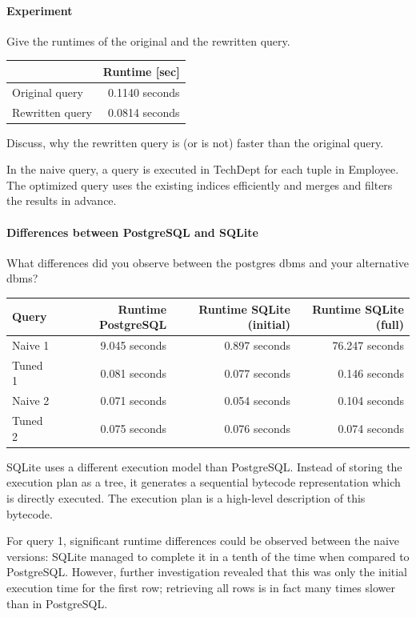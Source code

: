\documentclass[11pt]{scrartcl}
\begin{document}
\paragraph{Experiment}

Give the runtimes of the original and the rewritten query.

\begin{table}[H]
  \centering
  \begin{tabular}{l|r}
    & Runtime [sec] \tabularnewline
    \hline
    Original query  & 0.1140 seconds \tabularnewline
    Rewritten query & 0.0814 seconds \tabularnewline
  \end{tabular}
\end{table}

Discuss, why the rewritten query is (or is not) faster than the original query.

In the naive query, a query is executed in TechDept for each tuple in Employee. The optimized query uses the existing indices efficiently and merges and filters the results in advance.

\paragraph{Differences between PostgreSQL and SQLite}

What differences did you observe between the postgres dbms and your alternative dbms?

\begin{table}[H]
  \centering
  \begin{tabular}{l|r|r|r}
    Query & Runtime PostgreSQL & Runtime SQLite (initial) & Runtime SQLite (full) \tabularnewline
    \hline
    Naive 1 & 9.045 seconds & 0.897 seconds & 76.247 seconds \tabularnewline
    Tuned 1 & 0.081 seconds & 0.077 seconds & 0.146 seconds \tabularnewline
    Naive 2 & 0.071 seconds & 0.054 seconds & 0.104 seconds \tabularnewline
    Tuned 2 & 0.075 seconds & 0.076 seconds & 0.074 seconds \tabularnewline
  \end{tabular}
\end{table}

SQLite uses a different execution model than PostgreSQL.  Instead of storing the execution plan as a tree, it generates a sequential bytecode representation which is directly executed.  The execution plan is a high-level description of this bytecode.

For query 1, significant runtime differences could be observed between the naive versions: SQLite managed to complete it in a tenth of the time when compared to PostgreSQL. However, further investigation revealed that this was only the initial execution time for the first row; retrieving all rows is in fact many times slower than in PostgreSQL.
\end{document}
